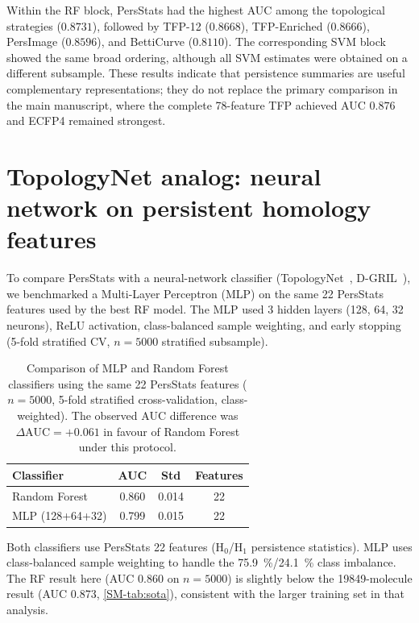 \documentclass[11pt,a4paper]{article}
\begin{document}
Within the RF block, PersStats had the highest AUC among the topological strategies ($\num{0.8731}$), followed by TFP-12 ($\num{0.8668}$), TFP-Enriched ($\num{0.8666}$), PersImage ($\num{0.8596}$), and BettiCurve ($\num{0.8110}$). The corresponding SVM block showed the same broad ordering, although all SVM estimates were obtained on a different subsample. These results indicate that persistence summaries are useful complementary representations; they do not replace the primary comparison in the main manuscript, where the complete 78-feature TFP achieved AUC $\num{0.876}$ and ECFP4 remained strongest.


\section{TopologyNet analog: neural network on persistent homology features}
\label{sec:topologynet_analog}

To compare PersStats with a neural-network classifier (TopologyNet~\citep{topologynet_2018}, D-GRIL~\citep{dgril_2026}), we benchmarked a Multi-Layer Perceptron (MLP) on the same 22 PersStats features used by the best RF model. The MLP used 3 hidden layers (128, 64, 32 neurons), ReLU activation, class-balanced sample weighting, and early stopping (5-fold stratified CV, $n = \num{5000}$ stratified subsample).

\begin{table}[htbp]
\centering
\caption{Comparison of MLP and Random Forest classifiers using the same 22 PersStats features ($n=\num{5000}$, 5-fold stratified cross-validation, class-weighted). The observed AUC difference was $\Delta\mathrm{AUC}=+\num{0.061}$ in favour of Random Forest under this protocol.}
\label{tab:topologynet_analog}
\begin{tabularx}{\textwidth}{l S[table-format=1.4] S[table-format=1.4] S[table-format=1.0]}
\toprule
{Classifier} & {AUC} & {Std} & {Features} \\
\midrule
Random Forest & 0.860 & 0.014 & 22 \\
MLP (128+64+32) & 0.799 & 0.015 & 22 \\
\bottomrule
\end{tabularx}
\vspace{1mm}
\footnotesize Both classifiers use PersStats 22 features (H$_0$/H$_1$ persistence statistics). MLP uses class-balanced sample weighting to handle the \qty{75.9}{\percent}/\qty{24.1}{\percent} class imbalance. The RF result here (AUC \num{0.860} on $n = \num{5000}$) is slightly below the \num{19849}-molecule result (AUC \num{0.873}, \cref{SM-tab:sota}), consistent with the larger training set in that analysis.
\end{table}
\end{document}
